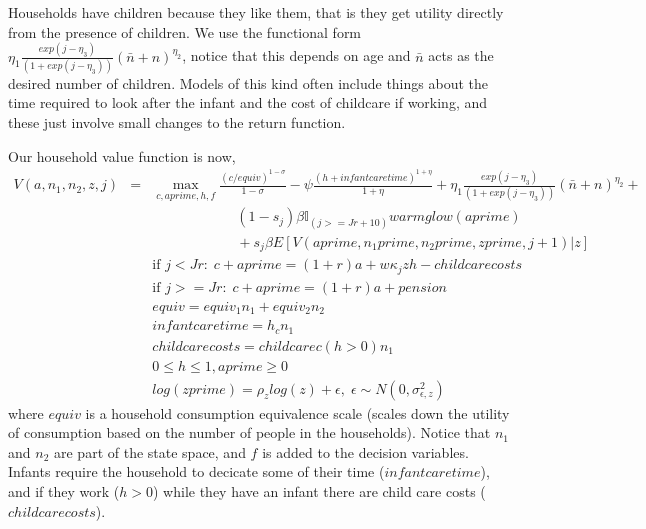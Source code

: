 Households have children because they like them, that is they get utility directly from the presence of children. We use the functional form $\eta_1 \frac{exp(j-\eta_3)}{(1+exp(j-\eta_3))} (\bar{n} + n)^{\eta_2}$, notice that this depends on age and $\bar{n}$ acts as the desired number of children. Models of this kind often include things about the time required to look after the infant and the cost of childcare if working, and these just involve small changes to the return function.

Our household value function is now,
\begin{eqnarray*}
 V(a,n_1,n_2,z,j)&=& \max_{c,aprime,h,f} \frac{(c/equiv)^{1-\sigma}}{1-\sigma} - \psi \frac{(h+infantcaretime)^{1+\eta}}{1+\eta} + \eta_1 \frac{exp(j-\eta_3)}{(1+exp(j-\eta_3))} (\bar{n} + n)^{\eta_2} + \\
 && \quad \quad \quad \quad \quad \quad (1-s_j)\beta  \mathbb{I}_{(j>=Jr+10)} warmglow(aprime)    \\
 && \quad \quad \quad \quad \quad \quad  + s_j \beta E[V(aprime,n_1 prime, n_2 prime, zprime,j+1)|z] \\
&& \text{if }j<Jr: \; c+aprime=(1+r)a+w \kappa_j z h-childcarecosts \\
&& \text{if }j>=Jr: \; c+aprime=(1+r)a +pension \\
&& equiv=equiv_1 n_1+equiv_2 n_2 \\
&& infantcaretime=h_c n_1 \\
&& childcarecosts=childcarec (h>0) n_1  \\
&& 0\leq h \leq 1, aprime\geq 0 \\
&& log(zprime)=\rho_z log(z) + \epsilon, \; \epsilon \sim N(0,\sigma_{\epsilon,z}^2)
\end{eqnarray*}
where $equiv$ is a household consumption equivalence scale (scales down the utility of consumption based on the number of people in the households). Notice that $n_1$ and $n_2$ are part of the state space, and $f$ is added to the decision variables. Infants require the household to decicate some of their time ($infantcaretime$), and if they work ($h>0$) while they have an infant there are child care costs ($childcarecosts$).

